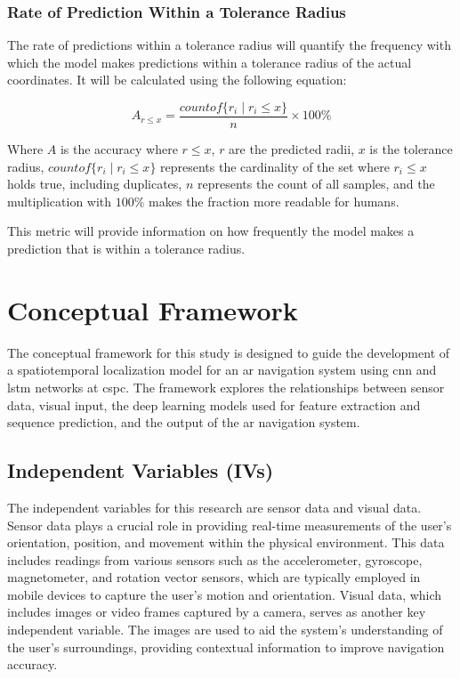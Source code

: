 \begin{refsection}
\subsubsection{Rate of Prediction Within a Tolerance Radius}

The rate of predictions within a tolerance radius will quantify the frequency with which the model makes predictions within a tolerance radius of the actual coordinates. It will be calculated using the following equation:

\begin{equation}
A_{r \leq x} = \frac{countof\{r_i \mid r_i \leq x\}}{n} \times 100\%
\label{eq:acc}
\end{equation}

Where \(A\) is the accuracy where \(r \leq x\), \(r\) are the predicted radii, \(x\) is the tolerance radius, \(countof\{r_i \mid r_i \leq x\}\) represents the cardinality of the set where \(r_i \leq x\) holds true, including duplicates, \(n\) represents the count of all samples, and the multiplication with \(100\%\) makes the fraction more readable for humans.

This metric will provide information on how frequently the model makes a prediction that is within a tolerance radius.

\section{Conceptual Framework}

The conceptual framework for this study is designed to guide the development of a spatiotemporal localization model for an \gls{ar} navigation system using \gls{cnn} and \gls{lstm} networks at \gls{cspc}. The framework explores the relationships between sensor data, visual input, the deep learning models used for feature extraction and sequence prediction, and the output of the \gls{ar} navigation system.

\subsection{Independent Variables (IVs)}

The independent variables for this research are sensor data and visual data. Sensor data plays a crucial role in providing real-time measurements of the user's orientation, position, and movement within the physical environment. This data includes readings from various sensors such as the accelerometer, gyroscope, magnetometer, and rotation vector sensors, which are typically employed in mobile devices to capture the user's motion and orientation.
Visual data, which includes images or video frames captured by a camera, serves as another key independent variable. The images are used to aid the system's understanding of the user's surroundings, providing contextual information to improve navigation accuracy.


\end{refsection}
